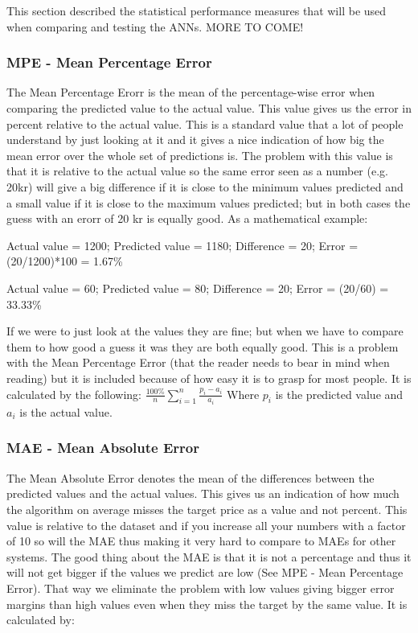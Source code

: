 This section described the statistical performance measures that will be used when comparing and testing the ANNs. MORE TO COME!

\subsubsection{MPE - Mean Percentage Error}
The Mean Percentage Erorr is the mean of the percentage-wise error when comparing the predicted value to the actual value. This value gives us the error in percent relative to the actual value. This is a standard value that a lot of people understand by just looking at it and it gives a nice indication of how big the mean error over the whole set of predictions is. The problem with this value is that it is relative to the actual value so the same error seen as a number (e.g. 20kr) will give a big difference if it is close to the minimum values predicted and a small value if it is close to the maximum values predicted; but in both cases the guess with an erorr of 20 kr is equally good. As a mathematical example:

Actual value = 1200; Predicted value = 1180; Difference = 20; Error = (20/1200)*100 = 1.67\% 

Actual value = 60; Predicted value = 80; Difference = 20; Error = (20/60) = 33.33\%

If we were to just look at the values they are fine; but when we have to compare them to how good a guess it was they are both equally good. This is a problem with the Mean Percentage Error (that the reader needs to bear in mind when reading) but it is included because of how easy it is to grasp for most people.
It is calculated by the following:
$ \frac{100\%}{n}\sum_{i=1}^{n}\frac{p_i - a_i}{a_i} $
Where $p_i$ is the predicted value and $a_i$ is the actual value.
\subsubsection{MAE - Mean Absolute Error}
\label{sec:maeStatistics}
The Mean Absolute Error denotes the mean of the differences between the predicted values and the actual values. This gives us an indication of how much the algorithm on average misses the target price as a value and not percent. This value is relative to the dataset and if you increase all your numbers with a factor of 10 so will the MAE thus making it very hard to compare to MAEs for other systems. The good thing about the MAE is that it is not a percentage and thus it will not get bigger if the values we predict are low (See MPE - Mean Percentage Error). That way we eliminate the problem with low values giving bigger error margins than high values even when they miss the target by the same value. It is calculated by:

